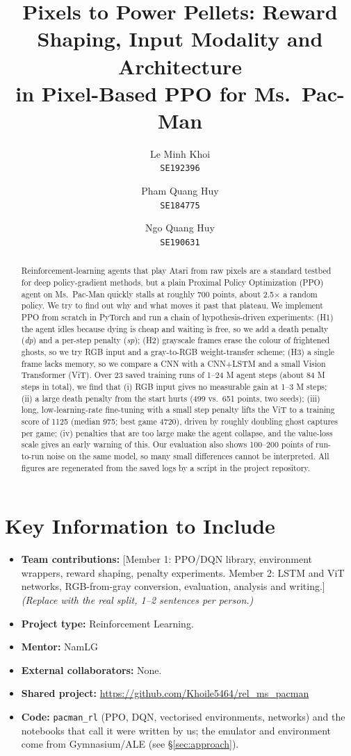 \documentclass[11pt]{article}
\title{\vspace{-1.2em}\textbf{Pixels to Power Pellets: Reward Shaping, Input Modality and Architecture\\ in Pixel-Based PPO for Ms.\ Pac-Man}}
\author{
  Le Minh Khoi \\ \texttt{SE192396} \and
  Pham Quang Huy \\ \texttt{SE184775} \and
  Ngo Quang Huy \\ \texttt{SE190631} 
}
\date{}
\newcommand{\dpen}{\textit{dp}}
\newcommand{\spen}{\textit{sp}}
\begin{document}
\maketitle

\section*{Key Information to Include}
\vspace{-0.5em}
\begin{itemize}\setlength{\itemsep}{0pt}
  \item \textbf{Team contributions:} [Member 1: PPO/DQN library, environment wrappers, reward shaping, penalty experiments.  Member 2: LSTM and ViT networks, RGB-from-gray conversion, evaluation, analysis and writing.] \emph{(Replace with the real split, 1--2 sentences per person.)}
  \item \textbf{Project type:} Reinforcement Learning.
  \item \textbf{Mentor:} NamLG
  \item \textbf{External collaborators:} None. \item \textbf{Shared project:} \url{https://github.com/Khoile5464/rel_ms_pacman}
  \item \textbf{Code:} \texttt{pacman\_rl} (PPO, DQN, vectorised environments, networks) and the notebooks that call it were written by us; the emulator and environment come from Gymnasium/ALE (see \S\ref{sec:approach}).
\end{itemize}

\begin{abstract}
Reinforcement-learning agents that play Atari from raw pixels are a standard testbed for deep policy-gradient methods, but a plain Proximal Policy Optimization (PPO) agent on Ms.\ Pac-Man quickly stalls at roughly 700 points, about 2.5$\times$ a random policy. We try to find out why and what moves it past that plateau. We implement PPO from scratch in PyTorch and run a chain of hypothesis-driven experiments: (H1) the agent idles because dying is cheap and waiting is free, so we add a death penalty (\dpen) and a per-step penalty (\spen); (H2) grayscale frames erase the colour of frightened ghosts, so we try RGB input and a gray-to-RGB weight-transfer scheme; (H3) a single frame lacks memory, so we compare a CNN with a CNN+LSTM and a small Vision Transformer (ViT). Over 23 saved training runs of 1--24 M agent steps (about 84 M steps in total), we find that (i) RGB input gives no measurable gain at 1--3 M steps; (ii) a large death penalty from the start hurts (499 vs.\ 651 points, two seeds); (iii) long, low-learning-rate fine-tuning with a small step penalty lifts the ViT to a training score of 1125 (median 975; best game 4720), driven by roughly doubling ghost captures per game; (iv) penalties that are too large make the agent collapse, and the value-loss scale gives an early warning of this. Our evaluation also shows 100--200 points of run-to-run noise on the same model, so many small differences cannot be interpreted. All figures are regenerated from the saved logs by a script in the project repository.
\end{abstract}
\end{document}

